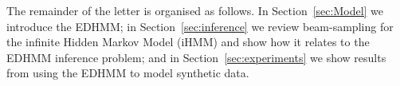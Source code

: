 The remainder of the letter is organised as follows.  In Section~\ref{sec:Model} we introduce the EDHMM; in Section~\ref{sec:inference} we review beam-sampling for the infinite Hidden Markov Model (iHMM) \cite{Beal2002} and show how it relates to the EDHMM inference problem; and in Section~\ref{sec:experiments} we show results from using the EDHMM to model synthetic data.  
